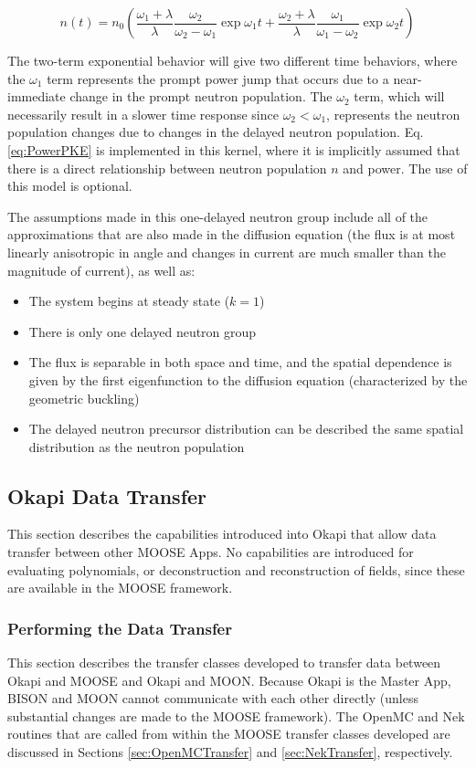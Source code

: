 \documentclass[10pt]{article}
\newcommand{\beq}{\begin{equation}}
\newcommand{\eeq}{\end{equation}}
\numberwithin{equation}{section} %
\begin{document}
\beq
\label{eq:PowerPKE}
n(t)=n_0\left(\frac{\omega_1+\lambda}{\lambda}\frac{\omega_2}{\omega_2-\omega_1}\exp{\omega_1 t} + \frac{\omega_2+\lambda}{\lambda}\frac{\omega_1}{\omega_1-\omega_2}\exp{\omega_2 t}\right)
\eeq

The two-term exponential behavior will give two different time behaviors, where the \(\omega_1\) term represents the prompt power jump that occurs due to a near-immediate change in the prompt neutron population. The \(\omega_2\) term, which will necessarily result in a slower time response since \(\omega_2<\omega_1\), represents the neutron population changes due to changes in the delayed neutron population. Eq. \eqref{eq:PowerPKE} is implemented in this kernel, where it is implicitly assumed that there is a direct relationship between neutron population \(n\) and power. The use of this model is optional.

The assumptions made in this one-delayed neutron group include all of the approximations that are also made in the diffusion equation (the flux is at most linearly anisotropic in angle and changes in current are much smaller than the magnitude of current), as well as:

\begin{itemize}
\item The system begins at steady state (\(k=1\))
\item There is only one delayed neutron group
\item The flux is separable in both space and time, and the spatial dependence is given by the first eigenfunction to the diffusion equation (characterized by the geometric buckling)
\item The delayed neutron precursor distribution can be described the same spatial distribution as the neutron population
\end{itemize}

\subsection{Okapi Data Transfer}
This section describes the capabilities introduced into Okapi that allow data transfer between other MOOSE Apps. No capabilities are introduced for evaluating polynomials, or deconstruction and reconstruction of fields, since these are available in the MOOSE framework.

\subsubsection{Performing the Data Transfer}
This section describes the transfer classes developed to transfer data between Okapi and MOOSE and Okapi and MOON. Because Okapi is the Master App, BISON and MOON cannot communicate with each other directly (unless substantial changes are made to the MOOSE framework). The OpenMC and Nek routines that are called from within the MOOSE transfer classes developed are discussed in Sections \ref{sec:OpenMCTransfer} and \ref{sec:NekTransfer}, respectively. 
\end{document}
